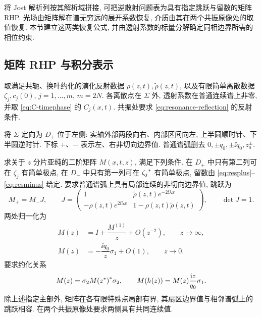 将 Jost 解析列按其解析域拼接, 可把逆散射问题表为具有指定跳跃与留数的矩阵 RHP.
光场由矩阵解在谱无穷远的展开系数恢复, 介质由其在两个共振原像处的取值恢复.
本节建立这两类恢复公式, 并由透射系数的标量分解确定同相边界所需的相位约束.

\subsection{矩阵 RHP 与积分表示}
取满足共轭、换叶约化的演化反射数据 $\rho(z,t),\widetilde\rho(z,t)$,
以及有限简单离散数据 $\zeta_j,c_j(0)$, $j=1,\ldots,m$, $m=2N$.
各离散点在 $\Sigma$ 外, 透射系数在普通连续谱上非零,
并取 \eqref{eq:C-timephase} 的 $C_j(x,t)$.
共振处要求 \eqref{eq:resonance-reflection} 的反射条件.

将 $\Sigma$ 定向为 $D_+$ 位于左侧: 实轴外部两段向右、内部区间向左,
上半圆顺时针、下半圆逆时针. 下标 $+$、$-$ 表示左、右非切向边界值.
普通谱弧删去 $0,\pm q_0,\pm\ii q_0,z_a^\pm$.

\begin{definition}\label{def:RHP}\label{thm:RHP}
求关于 $z$ 分片亚纯的二阶矩阵 $M(x,t,z)$, 满足下列条件.
在 $D_+$ 中只有第二列可在 $\zeta_j$ 有简单极点,
在 $D_-$ 中只有第一列可在 ${\zeta_j}^{*}$ 有简单极点, 留数由 \eqref{eq:resplus}--\eqref{eq:resminus} 给定.
要求普通谱弧上具有局部连续的非切向边界值, 跳跃为
\begin{equation}\label{eq:jump}
M_+=M_-J,\qquad
J=\begin{pmatrix}
1&\widetilde\rho(z,t)e^{-2\ii\lambda x}\\
-\rho(z,t)e^{2\ii\lambda x}&1-\rho(z,t)\widetilde\rho(z,t)
\end{pmatrix},\qquad \det J=1.
\end{equation}
两处归一化为
\begin{align}
M(z)&=I+\dfrac{M^{(1)}}{z}+O(z^{-2}),\qquad z\to\infty,\label{eq:Minfty}\\
M(z)&=-\dfrac{\ii q_0}{z}\sigma_1+O(1),\qquad z\to0.\label{eq:Mzero}
\end{align}
要求约化关系
\begin{equation}\label{eq:Msym}
M(z)=\sigma_2{M({z}^{*})}^{*}\sigma_2,\qquad
M(h(z))=M(z)\dfrac{\mathrm{i} z}{q_0}\sigma_1.
\end{equation}
除上述指定主部外, 矩阵在各有限特殊点局部有界,
其扇区边界值与相邻谱弧上的跳跃相容.
在两个共振原像处要求两侧具有共同连续值.
\end{definition}

